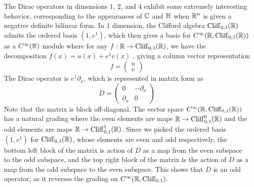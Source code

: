 The Dirac operators in dimensions $1$, $2$, and $4$ exhibit some extremely
interesting behavior, corresponding to the appearances of $\mathbb{C}$ and $\mathbb{H}$
when $\mathbb{R}^n$ is given a negative definite bilinear form. In $1$ dimension,
the Clifford algebra $\operatorname{Cliff}_{0,1}(\mathbb{R})$ admits the ordered basis $(1,e^1)$, which
then gives a basis for $C^\infty(\mathbb{R}, \operatorname{Cliff}_{0,1}(\mathbb{R}))$ as a
$C^\infty(\mathbb{R})$ module where for any $f : \mathbb{R} \to \operatorname{Cliff}_{0,1}(\mathbb{R})$, we have the
decomposition $f(x) = u(x) + e^1 v(x)$ , giving a column vector representation
\[
 f = \begin{pmatrix}
 u \\
 v
 \end{pmatrix}
\]
The Dirac operator is $e^1\partial_x$, which is represented in matrix form as
\[
 D = \begin{pmatrix}
 0 & -\partial_x \\
 \partial_x & 0
 \end{pmatrix}
\]
Note that the matrix is block off-diagonal. The vector space
$C^\infty(\mathbb{R}, \operatorname{Cliff}_{0,1}(\mathbb{R}))$ has a natural grading where the even elements
are maps $\mathbb{R} \to \operatorname{Cliff}_{0,1}^0(\mathbb{R})$ and the odd elements are maps
$\mathbb{R} \to \operatorname{Cliff}_{0,1}^1(\mathbb{R})$. Since we picked the ordered basis $(1,e^1)$
for $\operatorname{Cliff}_{0,1}(\mathbb{R})$, whose elements are even and odd respectively, the bottom
left block of the matrix is action of $D$ as a map from the even subspace to
the odd subspace, and the top right block of the matrix is the action of $D$
as a map from the odd subspace to the even subspace.
This shows that $D$ is an odd operator, as it reverses the grading on
$C^\infty(\mathbb{R}, \operatorname{Cliff}_{0,1})$. \\

